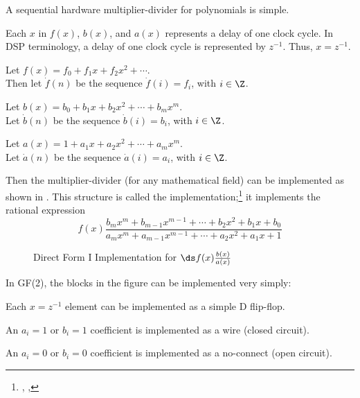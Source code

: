 A sequential hardware multiplier-divider for polynomials is simple.
\begin{liste}
   \item Each $x$ in $f(x)$, $b(x)$, and $a(x)$ represents a delay of one clock cycle.
In DSP terminology, a delay of one clock cycle is represented by $z^{-1}$.
Thus, $x=z^{-1}$.
   \item Let $f(x)=f_0 + f_1x + f_2x^2 + \cdots$.\\
         Then let $\dot{f}(n)$ be the sequence $\dot{f}(i)=f_i$, with $i\in\Z$.
   \item Let $b(x)= b_0 + b_1x + b_2x^2 + \cdots + b_mx^m$.\\
         Let $\dot{b}(n)$ be the sequence $\dot{b}(i)=b_i$, with $i\in\Z$.
   \item Let $a(x)=1 + a_1x + a_2x^2 + \cdots + a_mx^m$.\\
         Let $\dot{a}(n)$ be the sequence $\dot{a}(i)=a_i$, with $i\in\Z$.
\end{liste}
Then the multiplier-divider (for any mathematical field) can be implemented as shown
in .  
This structure is called the  implementation;\footnote{
  ,
  ,
  }
it implements the rational expression
\[
   f(x) \frac{b_mx^m + b_{m-1}x^{m-1} + \cdots + b_2x^2 + b_1x + b_0}
             {a_mx^m + a_{m-1}x^{m-1} + \cdots + a_2x^2 + a_1x + 1  }
\]

\begin{figure}[ht]
\caption{
   Direct Form I Implementation for $\ds f(x)\frac{b(x)}{a(x)}$
   \label{fig:df1}
   }
\end{figure}

In GF(2), the blocks in the figure can be implemented very simply:
\begin{liste}
   \item Each $x=z^{-1}$ element can be implemented as a simple D flip-flop.
   \item An $a_i=1$ or $b_i=1$ coefficient is implemented as a wire (closed circuit).
   \item An $a_i=0$ or $b_i=0$ coefficient is implemented as a no-connect (open circuit).
\end{liste}

